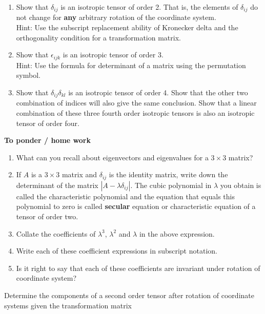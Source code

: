 \begin{enumerate}{}{}
\item Show that $\delta_{ij}$ is an isotropic tensor of order 2. That is, the elements of $\delta_{ij}$ do not change for {\bf any} arbitrary rotation of the coordinate system.\\
Hint: Use the subscript replacement ability of Kronecker delta and the orthogonality condition for a transformation matrix.

\item Show that $\epsilon_{ijk}$ is an isotropic tensor of order 3.\\
Hint: Use the formula for determinant of a matrix using the permutation symbol.

\item Show that $\delta_{ij} \delta_{kl}$ is an isotropic tensor of order 4. Show that the other two combination of indices will also give the same conclusion. Show that a linear combination of these three fourth order isotropic tensors is also an isotropic tensor of order four.

\end{enumerate}


{\bf To ponder / home work}

\begin{enumerate}
\item What can you recall about eigenvectors and eigenvalues for a $3 \times 3$ matrix?
\item If $A$ is a $3 \times 3$ matrix and $\delta_{ij}$ is the identity matrix, write down the determinant of the matrix $\left| A - \lambda \delta_{ij} \right|$. The cubic polynomial in $\lambda$ you obtain is called the characteristic polynomial and the equation that equals this polynomial to zero is called {\bf secular} equation or characteristic equation of a tensor of order two.
\item Collate the coefficients of $\lambda^3$, $\lambda^2$ and $\lambda$ in the above expression.
\item Write each of these coefficient expressions in subscript notation.
\item Is it right to say that each of these coefficients are invariant under rotation of coordinate system?
\end{enumerate}

\begin{lo2}
\item Determine the components of a second order tensor after rotation of coordinate systems given the transformation matrix
\end{lo2}

